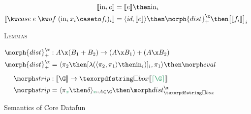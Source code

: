 \begin{figure*}
  \begin{align*}
    \den{\inj i e} &= \den{e} \then \injc_i
    \\
    \den{\ecase{e} (\inj i{x_i} \caseto f_i)_i} &=
    \fork{\id, \den{e}} \then \morph{dist}^\x_+ \then \bigkrof{\den{f_i}}_i
  \end{align*}
  \vspace{0pt} %

  \textsc{Lemmas}

  \begin{align*}
    \morph{dist}^\x_+ &: A \x (B_1 + B_2) \to (A \x B_1) + (A \x B_2)\\
    \morph{dist}^\x_+ &= \fork{\pi_2 \then \krof{\lambda (\fork{\pi_2,\pi_1} \then \injc_i)}_i, \pi_1}
    \then \eval
    \\[1ex]
    \strip &: \den\G \to \discof{\den{\stripcx\G}}\\
    \strip &= \fork{\pi_{\dvar x} \then \delta}_{\hd x A \in \G} \then \discox
  \end{align*}



  \caption{Semantics of Core Datafun}
  \label{fig:semantics}\label{def:strip}
\end{figure*}

